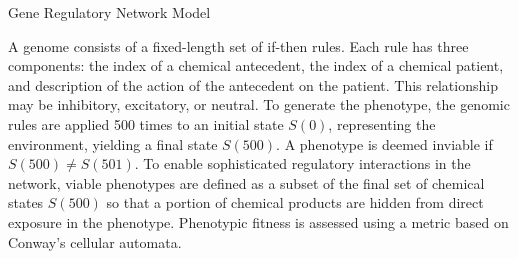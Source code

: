\begin{block}{Gene Regulatory Network Model}
\vspace{-1ex}

{\small 
A genome consists of a fixed-length set of if-then rules.
Each rule has three components: the index of a chemical antecedent, the index of a chemical patient, and description of the action of the antecedent on the patient.
This relationship may be inhibitory, excitatory, or neutral.
To generate the phenotype, the genomic rules are applied 500 times to an initial state $S(0)$, representing the environment, yielding a final state $S(500)$.
A phenotype is deemed inviable if $S(500) \neq S(501)$.
To enable sophisticated regulatory interactions in the network, viable phenotypes are defined as a subset of the final set of chemical states $S(500)$ so that a portion of chemical products are hidden from direct exposure in the phenotype.
Phenotypic fitness is assessed using a metric based on Conway's cellular automata.
}
\end{block}
